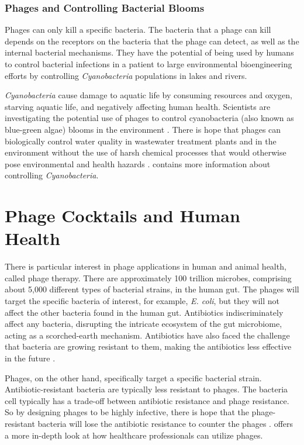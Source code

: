 \subsubsection{Phages and Controlling Bacterial Blooms}
Phages can only kill a specific bacteria. 
The bacteria that a phage can kill depends on the receptors on the bacteria that the phage can detect, as well as the internal bacterial mechanisms. 
They have the potential of being used by humans to control bacterial infections in a patient to large environmental bioengineering efforts by controlling \textit{Cyanobacteria} populations in lakes and rivers. 

\textit{Cyanobacteria} cause damage to aquatic life by consuming resources and oxygen, starving aquatic life, and negatively affecting human health. 
Scientists are investigating the potential use of phages to control cyanobacteria (also known as blue-green algae) blooms in the environment \cite{colomaFrequencyVirusresistantHosts2019}. 
There is hope that phages can biologically control water quality in wastewater treatment plants and in the environment without the use of harsh chemical processes that would otherwise pose environmental and health hazards \cite{krysiak-baltynSimulationPhageDynamics2017, tuckerIdentificationCyanophageMaLBP2005}. 
 contains more information about controlling \textit{Cyanobacteria}. 

\section{Phage Cocktails and Human Health}
There is particular interest in phage applications in human and animal health, called phage therapy. 
There are approximately 100 trillion microbes, comprising about 5,000 different types of bacterial strains, in the human gut. 
The phages will target the specific bacteria of interest, for example, \textit{E. coli}, but they will not affect the other bacteria found in the human gut. 
Antibiotics indiscriminately affect any bacteria, disrupting the intricate ecosystem of the gut microbiome, acting as a scorched-earth mechanism. 
Antibiotics have also faced the challenge that bacteria are growing resistant to them, making the antibiotics less effective in the future \cite{odonkorBacteriaResistanceAntibiotics2011, volkovaEffectsEarlylifePenicillin2021}. 

Phages, on the other hand, specifically target a specific bacterial strain. 
Antibiotic-resistant bacteria are typically less resistant to phages. 
The bacteria cell typically has a trade-off between antibiotic resistance and phage resistance. 
So by designing phages to be highly infective, there is hope that the phage-resistant bacteria will lose the antibiotic resistance to counter the phages \cite{laurePhageResistancemediatedTradeoffs2022, zhaoPhagedrivenCoevolutionReveals2024}. 
 offers a more in-depth look at how healthcare professionals can utilize phages.

